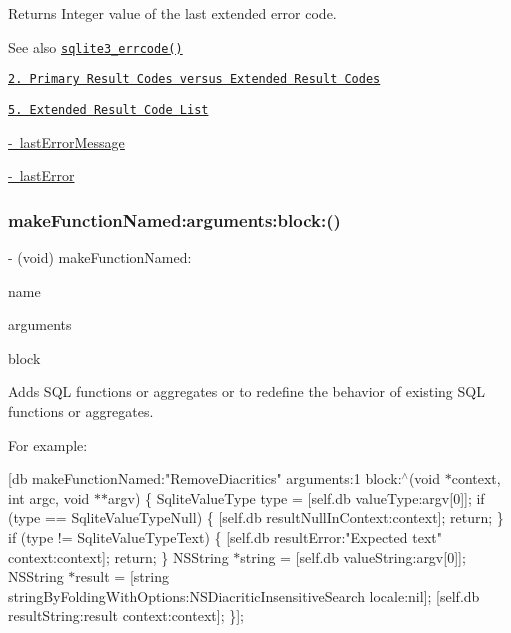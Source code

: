 \begin{DoxyReturn}{Returns}
Integer value of the last extended error code.
\end{DoxyReturn}
\begin{DoxySeeAlso}{See also}
\href{http://sqlite.org/c3ref/errcode.html}{\tt sqlite3\+\_\+errcode()} 

\href{http://sqlite.org/rescode.html#primary_result_codes_versus_extended_result_codes}{\tt 2. Primary Result Codes versus Extended Result Codes} 

\href{http://sqlite.org/rescode.html#extrc}{\tt 5. Extended Result Code List} 

\mbox{\hyperlink{interface_o_p_t_l_y_f_m_d_b_database_a082c5d58576df07956308656064e1f63}{-\/ last\+Error\+Message}} 

\mbox{\hyperlink{interface_o_p_t_l_y_f_m_d_b_database_a477a6ff4d9daaac53a56c0a058a0d2f7}{-\/ last\+Error}} 
\end{DoxySeeAlso}
\mbox{\label{interface_o_p_t_l_y_f_m_d_b_database_af2c3e10041c8d0a95e2feb84a2ffa645}} 
\subsubsection{\texorpdfstring{make\+Function\+Named\+:arguments\+:block\+:()}{makeFunctionNamed:arguments:block:()}}
{\footnotesize\ttfamily -\/ (void) make\+Function\+Named\+: \begin{DoxyParamCaption}\item[{(N\+S\+String $\ast$)}]{name }\item[{arguments:(int)}]{arguments }\item[{block:(void($^\wedge$)(void $\ast$context, int argc, void $\ast$\+\_\+\+Nonnull $\ast$\+\_\+\+Nonnull argv))}]{block }\end{DoxyParamCaption}}

Adds S\+QL functions or aggregates or to redefine the behavior of existing S\+QL functions or aggregates.

For example\+:

\mbox{[}db make\+Function\+Named\+:"Remove\+Diacritics" arguments\+:1 block\+:$^\wedge$(void $\ast$context, int argc, void $\ast$$\ast$argv) \{ Sqlite\+Value\+Type type = \mbox{[}self.\+db value\+Type\+:argv\mbox{[}0\mbox{]}\mbox{]}; if (type == Sqlite\+Value\+Type\+Null) \{ \mbox{[}self.\+db result\+Null\+In\+Context\+:context\mbox{]}; return; \} if (type != Sqlite\+Value\+Type\+Text) \{ \mbox{[}self.\+db result\+Error\+:"Expected text" context\+:context\mbox{]}; return; \} N\+S\+String $\ast$string = \mbox{[}self.\+db value\+String\+:argv\mbox{[}0\mbox{]}\mbox{]}; N\+S\+String $\ast$result = \mbox{[}string string\+By\+Folding\+With\+Options\+:N\+S\+Diacritic\+Insensitive\+Search locale\+:nil\mbox{]}; \mbox{[}self.\+db result\+String\+:result context\+:context\mbox{]}; \}\mbox{]};

